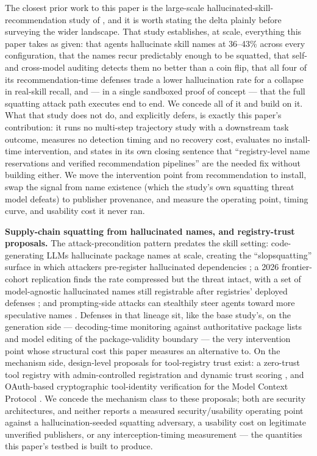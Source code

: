 \documentclass[11pt]{article}
\begin{document}
The closest prior work to this paper is the large-scale hallucinated-skill-recommendation study of \citet{hallucskills}, and it is worth stating the delta plainly before surveying the wider landscape. That study establishes, at scale, everything this paper takes as given: that agents hallucinate skill names at 36--43\% across every configuration, that the names recur predictably enough to be squatted, that self- and cross-model auditing detects them no better than a coin flip, that all four of its recommendation-time defenses trade a lower hallucination rate for a collapse in real-skill recall, and --- in a single sandboxed proof of concept --- that the full squatting attack path executes end to end. We concede all of it and build on it. What that study does not do, and explicitly defers, is exactly this paper's contribution: it runs no multi-step trajectory study with a downstream task outcome, measures no detection timing and no recovery cost, evaluates no install-time intervention, and states in its own closing sentence that ``registry-level name reservations and verified recommendation pipelines'' are the needed fix without building either. We move the intervention point from recommendation to install, swap the signal from name existence (which the study's own squatting threat model defeats) to publisher provenance, and measure the operating point, timing curve, and usability cost it never ran.

\textbf{Supply-chain squatting from hallucinated names, and registry-trust proposals.} The attack-precondition pattern predates the skill setting: code-generating LLMs hallucinate package names at scale, creating the ``slopsquatting'' surface in which attackers pre-register hallucinated dependencies \citep{spracklen,phantoms}; a 2026 frontier-cohort replication finds the rate compressed but the threat intact, with a set of model-agnostic hallucinated names still registrable after registries' deployed defenses \citep{packrange}; and prompting-side attacks can stealthily steer agents toward more speculative names \citep{npa}. Defenses in that lineage sit, like the base study's, on the generation side --- decoding-time monitoring against authoritative package lists \citep{packmonitor} and model editing of the package-validity boundary \citep{bound} --- the very intervention point whose structural cost this paper measures an alternative to. On the mechanism side, design-level proposals for tool-registry trust exist: a zero-trust tool registry with admin-controlled registration and dynamic trust scoring \citep{ztr}, and OAuth-based cryptographic tool-identity verification for the Model Context Protocol \citep{etdi}. We concede the mechanism class to these proposals; both are security architectures, and neither reports a measured security/usability operating point against a hallucination-seeded squatting adversary, a usability cost on legitimate unverified publishers, or any interception-timing measurement --- the quantities this paper's testbed is built to produce.
\end{document}
